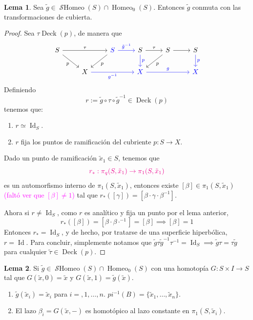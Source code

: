 \documentclass[spanish]{article}
\theoremstyle{definition}
\newtheorem*{lema}{Lema}
\DeclareMathOperator{\Id}{Id}
\DeclareMathOperator{\Homeo}{Homeo}
\DeclareMathOperator{\Deck}{Deck}
\DeclareMathOperator{\SHomeo}{\mathcal{S}Homeo}
\begin{document}
\begin{lema}
	Sea $\tilde{g}\in\SHomeo(S)\cap\Homeo_0(S)$. Entonces $\tilde{g}$ conmuta con las transformaciones de cubierta.
\end{lema}
\begin{proof}
	Sea $\tau\Deck(p)$, de manera que
	\[\begin{tikzcd}
		S\arrow[rr,"\tau"]\arrow[dr,"p",swap]&&\textcolor{blue}{S}\arrow[dl,"p"]\arrow[r,"\tilde{g}^{-1}",blue]&S\arrow[r,"\tau"]\arrow[d,"p",blue]&S\arrow[dl,"p"]\arrow[r]&S\arrow[d,"p",blue]\\
		&X\arrow[rr,blue,swap,"g^{-1}"]&&\textcolor{blue}{X}\arrow[rr,"g",blue]&&\textcolor{blue}{X}
	\end{tikzcd}\]
	Definiendo
	\[r:=\tilde{g}\circ\tau\circ\tilde{g}^{-1}\in\Deck(p)\]
	tenemos que:
	\begin{enumerate}
		\item $r\simeq\Id_S$.
		\item $r$ fija los puntos de ramificación del cubriente $p:S\to X$.
	\end{enumerate}
	Dado un punto de ramificación $\tilde{x}_1\in S$, tenemos que 
	\[\textcolor{magenta}{r_*:\pi_q(S,\tilde{x}_1)\to\pi_1(S,\tilde{x}_1)}\]
	es un automorfismo interno de $\pi_1(S,\tilde{x}_1)$, entonces existe $[\beta]\in\pi_1(S,\tilde{x}_1)$ \textcolor{magenta}{(faltó ver que $[\beta]\neq1$)} tal que $r_*([\gamma])=[\beta\cdot\gamma\cdot\beta^{-1}]$.
	
	Ahora si $r\neq\Id_S$, como $r$ es analítico y fija un punto por el lema anterior,
	\[r_*([\beta])=[\beta\cdot\beta\cdot^{-1}]=[\beta]\implies[\beta]=1\]
	Entonces $r_*=\Id_S$, y de hecho, por tratarse de una superficie hiperbólica, $r=\Id$. Para concluir, simplemente notamos que $\tilde{g}\tau\tilde{g}^{-1}\tau^{-1}=\Id_S\implies \tilde{g}\tau=\tau\tilde{g}$ para cualquier $\tilde{\tau}\in\Deck(p)$.
\end{proof}
\begin{lema}
	Si $\tilde{g}\in\SHomeo(S)\cap\Homeo_0(S)$ con una homotopía $G:S\times I\to S$ tal que $G(\tilde{x},0)=\tilde{x}$ y $G(\tilde{x},1)=\tilde{g}(\tilde{x})$.
	\begin{enumerate}
		\item $\tilde{g}(\tilde{x}_i)=\tilde{x}_i$ para $i=,1,\ldots,n$. $pi^{-1}(B)=\{\tilde{x}_1,\ldots,\tilde{x}_n\}$.
		\item El lazo $\beta_i=G(\tilde{x},-)$ es homotópico al lazo constante en $\pi_1(S,\tilde{x}_i)$.
	\end{enumerate}
\end{lema}
\end{document}

